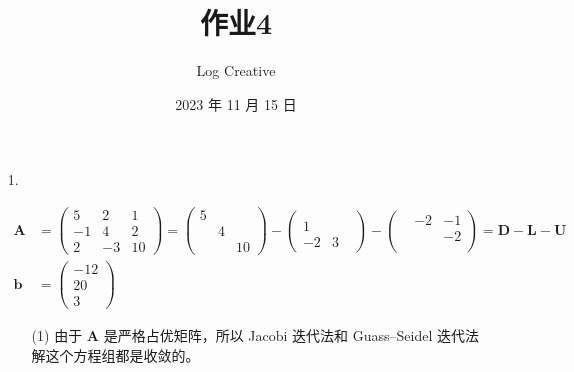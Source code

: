\documentclass{sjtuarticle}
\title{作业4}
\author{Log Creative}
\date{2023 年 11 月 15 日}
\begin{document}
\maketitle

\begin{itemize}
    \item[1.]\begin{solution}
    \begin{align*}
        \bm{A}&=\begin{pmatrix}
            5 & 2 & 1 \\
            -1 & 4 & 2 \\
            2 & -3 & 10
        \end{pmatrix}=\begin{pmatrix}
            5\\ & 4\\ & & 10 
        \end{pmatrix}-\begin{pmatrix}
            \\ 1 \\ -2 & 3 &
        \end{pmatrix}-\begin{pmatrix}
            & -2 & -1 \\ & & -2 \\ &
        \end{pmatrix}=\bm{D}-\bm{L}-\bm{U} \\
        \bm{b}&=\begin{pmatrix}
            -12 \\ 20 \\ 3
        \end{pmatrix}
    \end{align*}
    \begin{itemize}
        \item[(1)] 由于 $\bm{A}$ 是严格占优矩阵，所以 Jacobi 迭代法和 Guass--Seidel 迭代法解这个方程组都是收敛的。


\end{itemize}
\end{solution}
\end{itemize}
\end{document}
